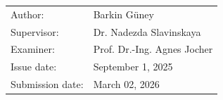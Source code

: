 \begin{titlepage}
	\vspace*{\fill}
	
	\normalsize
	\begin{flushleft}
		\begin{tabular}{l l}
			Author:					& Barkin Güney\\[-0.1cm]
			Supervisor:     		& Dr. Nadezda Slavinskaya\\[-0.1cm]
			Examiner:				& Prof. Dr.-Ing. Agnes Jocher\\[-0.1cm]
			Issue date:        		& {September 1, 2025} \\[-0.1cm]
			Submission date:        & {March 02, 2026} \\[-0.1cm]
		\end{tabular}
	\end{flushleft}
\end{titlepage}	